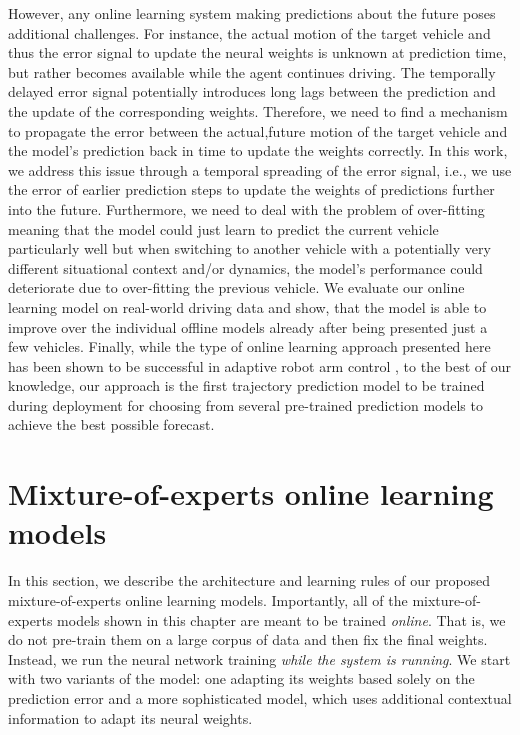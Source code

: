 However, any online learning system making predictions about the future poses additional challenges.
For instance, the actual motion of the target vehicle and thus the error signal to update the neural weights is unknown at prediction time, but rather becomes available while the agent continues driving.
The temporally delayed error signal potentially introduces long lags between the prediction and the update of the corresponding weights.
Therefore, we need to find a mechanism to propagate the error between the actual,future motion of the target vehicle and the model's prediction back in time to update the weights correctly.
In this work, we address this issue through a temporal spreading of the error signal, i.e., we use the error of earlier prediction steps to update the weights of predictions further into the future.
Furthermore, we need to deal with the problem of over-fitting meaning that the model could just learn to predict the current vehicle particularly well but when switching to another vehicle with a potentially very different situational context and/or dynamics, the model's performance could deteriorate due to over-fitting the previous vehicle.
We evaluate our online learning model on real-world driving data and show, that the model is able to improve over the individual offline models already after being presented just a few vehicles.
Finally, while the type of online learning approach presented here has been shown to be successful in adaptive robot arm control \cite{DeWolf2016}, to the best of our knowledge, our approach is the first trajectory prediction model to be trained during deployment for choosing from several pre-trained prediction models to achieve the best possible forecast.  


\section{Mixture-of-experts online learning models}%
\label{sec:instantiating_mixture_of_experts_online_learning_models}

In this section, we describe the architecture and learning rules of our proposed mixture-of-experts online learning models.
Importantly, all of the mixture-of-experts models shown in this chapter are meant to be trained \emph{online}.
That is, we do not pre-train them on a large corpus of data and then fix the final weights.
Instead, we run the neural network training \emph{while the system is running}.
We start with two variants of the model: one adapting its weights based solely on the prediction error and a more sophisticated model, which uses additional contextual information to adapt its neural weights.

